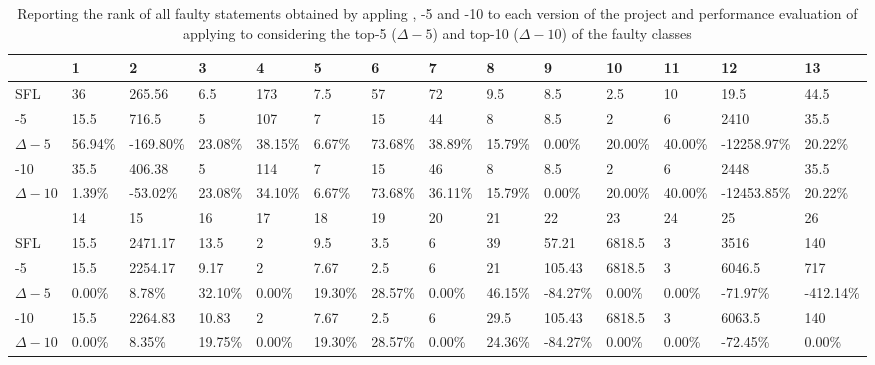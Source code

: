 \documentclass{article}
\begin{document}
\begin{appendices}
	\begin{table}[h]
		\small
		\setlength{\tabcolsep}{3pt}
		\begin{tabular}{@{}p{1.6cm}p{1cm}p{1.3cm}p{1cm}p{1cm}p{0.8cm}p{1cm}p{1cm}p{1cm}p{1.1cm}p{1cm}p{1cm}p{1.6cm}p{1.3cm}@{}}
		\toprule
			   & 1    & 2   & 3  & 4   & 5           & 6   & 7  & 8    & 9            & 10     & 11 & 12      & 13   \\ \midrule
		SFL    & 36   & 265.56    & 6.5         & 173 & 7.5         & 57  & 72 & 9.5  & 8.5          & 2.5    & 10 & 19.5    & 44.5 \\
		\comb{}-5   & 15.5 & 716.5       & 5           & 107 & 7           & 15  & 44 & 8    & 8.5          & 2      & 6  & 2410    & 35.5 \\
		$\Delta-5$  & 56.94\% & -169.80\%   & 23.08\%     & 38.15\% & 6.67\%      & 73.68\% & 38.89\% & 15.79\% & 0.00\%      & 20.00\% & 40.00\% & -12258.97\% & 20.22\%   \\
		\comb{}-10  & 35.5 & 406.38     & 5           & 114 & 7           & 15  & 46 & 8    & 8.5          & 2      & 6  & 2448    & 35.5 \\
		$\Delta-10$ & 1.39\%  & -53.02\%    & 23.08\%     & 34.10\% & 6.67\%      & 73.68\% & 36.11\% & 15.79\% & 0.00\%      & 20.00\% & 40.00\% & -12453.85\% & 20.22\%   \\\midrule
		& 14   & 15          & 16          & 17  & 18          & 19  & 20 & 21   & 22           & 23     & 24 & 25      & 26   \\\midrule
		SFL    & 15.5 & 2471.17 & 13.5        & 2   & 9.5         & 3.5 & 6  & 39   & 57.21  & 6818.5 & 3  & 3516    & 140  \\
		\comb{}-5   & 15.5 & 2254.17 & 9.17 & 2   & 7.67 & 2.5 & 6  & 21   & 105.43  & 6818.5 & 3  & 6046.5  & 717  \\
		$\Delta-5$  & 0.00\%  & 8.78\%      & 32.10\%     & 0.00\%  & 19.30\%     & 28.57\% & 0.00\%  & 46.15\% & -84.27\%    & 0.00\%  & 0.00\%  & -71.97\%    & -412.14\% \\
		\comb{}-10  & 15.5 & 2264.83 & 10.83 & 2   & 7.67 & 2.5 & 6  & 29.5 & 105.43  & 6818.5 & 3  & 6063.5  & 140  \\
		$\Delta-10$ & 0.00\%  & 8.35\%      & 19.75\%     & 0.00\%  & 19.30\%     & 28.57\% & 0.00\%  & 24.36\% & -84.27\%    & 0.00\%  & 0.00\%  & -72.45\%    & 0.00\% \\
		\bottomrule
		\end{tabular}
		\caption {Reporting the rank of all faulty statements obtained by appling \sfl{}, \comb{}-5 and \comb{}-10 to each version of the \chart{} project and performance evaluation of applying \ds{} to \sfl{} considering the top-5 ($\Delta-5$) and top-10 ($\Delta-10$) of the faulty classes}
		\label{table:performance}
	\end{table}
	\normalsize


\end{appendices}
\end{document}
